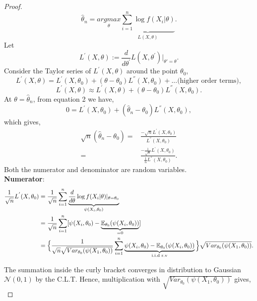 \documentclass[a4paper,english,12pt]{article}
\begin{document}
\begin{proof}
\begin{equation}
    \hat{\theta}_n=\underset{\theta}{arg max}\underbrace{\sum_{i=1}^{n}\log{f(X_i|\theta)}}_{L(X,\theta)}.
\end{equation}
Let
\begin{equation}
    L^{'}(X,\theta):=\frac{d}{d\theta^{'}}L(X,\theta^{'})|_{\theta{'}=\theta}.
\end{equation}
Consider the Taylor series of $L^{'}(X,\theta)$ around the point $\theta_0$,
\begin{equation}
    L^{'}(X,\theta)=L^{'}(X,\theta_0)+(\theta-\theta_0)L^{''}(X,\theta_0)+...\text{(higher order terms)},
\end{equation}
\begin{equation}
    L^{'}(X,\theta)\approx L^{'}(X,\theta)+(\theta-\theta_0)L^{''}(X,\theta_0).
\end{equation}
At $\theta=\hat{\theta}_n$, from equation 2 we have,
\begin{equation}
    0=L^{'}(X,\theta_0)+(\hat{\theta}_n-\theta_0)L^{''}(X,\theta_0),
\end{equation}
which gives,
\begin{align}
    \sqrt{n}(\hat{\theta}_n-\theta_0)=&\frac{-\sqrt{n}L^{'}(X,\theta_0)}{L^{''}(X,\theta_0)}\nonumber \\
    =&\frac{-\frac{1}{\sqrt{n}}L^{'}(X,\theta_0)}{\frac{1}{n}L^{''}(X,\theta_0)}.
\end{align}
Both the numerator and denominator are random variables.\\
\textbf{Numerator}:
\begin{align}
   \frac{1}{\sqrt{n}}L^{'}(X,\theta_0)&=\frac{1}{\sqrt{n}}\sum_{i=1}^{n}\underbrace{\frac{d}{d\theta}\log f(X_i|\theta)|_{\theta=\theta_0}}_{\psi(X_i,\theta_0)}\nonumber\\
    &=\frac{1}{\sqrt{n}}\sum_{i=1}^{n}[\psi(X_i,\theta_0)-\underbrace{\mathbb{E}_{\theta_0}(\psi(X_i,\theta_0))}_{=0}] \nonumber\\
    &=\Big\{\frac{1}{\sqrt{n}\sqrt{Var_{\theta_0}(\psi(X_1,\theta_0))}}\sum_{i=1}^{n}\underbrace{\psi(X_i,\theta_0)-\mathbb{E}_{\theta_0}(\psi(X_i,\theta_0))}_{\text{i.i.d r.v}}\Big\}\sqrt{Var_{\theta_0}(\psi(X_1,\theta_0))}. 
\end{align}
\par The summation inside the curly bracket converges in distribution to Gaussian $\mathcal{N}(0,1)$  by the C.L.T. Hence, multiplication with $\sqrt{Var_{\theta_0}(\psi(X_1,\theta_0))}$ gives,
\begin{equation}

\end{equation}
\end{proof}
\end{document}
